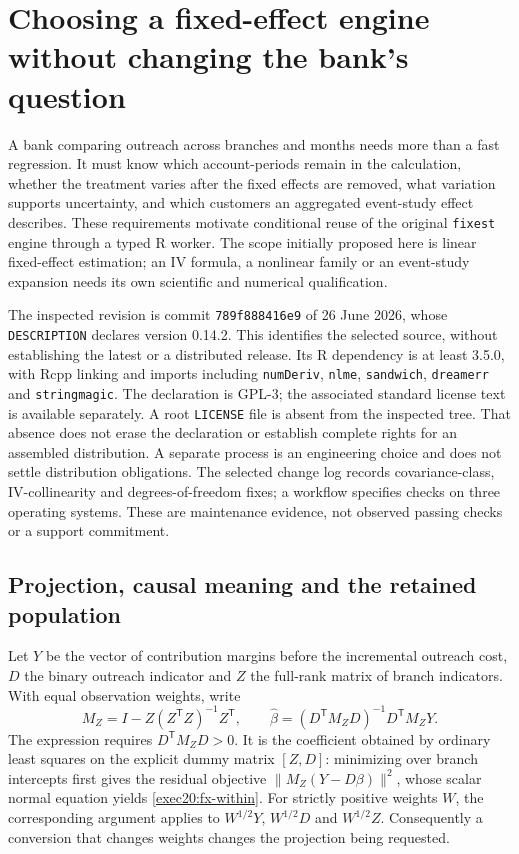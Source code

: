 \section{Choosing a fixed-effect engine without changing the bank's question}
\label{exec20:fx-scope}
A bank comparing outreach across branches and months needs more than a fast
regression. It must know which account-periods remain in the calculation, whether
the treatment varies after the fixed effects are removed, what variation supports
uncertainty, and which customers an aggregated event-study effect describes.
These requirements motivate conditional reuse of the original \texttt{fixest}
engine through a typed R worker. The scope initially proposed here is linear
fixed-effect estimation; an IV formula, a nonlinear family or an event-study
expansion needs its own scientific and numerical qualification.

The inspected revision is commit \texttt{789f888416e9} of 26 June 2026, whose
\texttt{DESCRIPTION} declares version 0.14.2. This identifies the selected source,
without establishing the latest or a distributed release. Its R dependency is
at least 3.5.0, with Rcpp linking and imports including \texttt{numDeriv},
\texttt{nlme}, \texttt{sandwich}, \texttt{dreamerr} and \texttt{stringmagic}.
The declaration is GPL-3; the associated standard license text is available
separately. A root \texttt{LICENSE} file is absent from the inspected tree.
That absence does not erase the declaration or establish complete rights for
an assembled distribution. A separate process is an engineering choice and
does not settle distribution obligations. The selected change log records
covariance-class, IV-collinearity and degrees-of-freedom fixes; a workflow
specifies checks on three operating systems. These are maintenance evidence,
not observed passing checks or a support commitment.~\citep{exec20_fixest_source}

\subsection{Projection, causal meaning and the retained population}
\label{exec20:fx-projection}
Let $Y$ be the vector of contribution margins before the incremental outreach
cost, $D$ the binary outreach indicator and $Z$ the full-rank matrix of branch
indicators. With equal observation weights, write
\begin{equation}
 M_Z=I-Z(Z^{\mathsf T}Z)^{-1}Z^{\mathsf T},\qquad
 \widehat\beta=(D^{\mathsf T}M_ZD)^{-1}D^{\mathsf T}M_ZY.
 \label{exec20:fx-within}
\end{equation}
The expression requires $D^{\mathsf T}M_ZD>0$. It is the coefficient obtained
by ordinary least squares on the explicit dummy matrix $[Z,D]$: minimizing
over branch intercepts first gives the residual objective
$\|M_Z(Y-D\beta)\|^2$, whose scalar normal equation yields
\eqref{exec20:fx-within}. For strictly positive weights $W$, the corresponding
argument applies to $W^{1/2}Y$, $W^{1/2}D$ and $W^{1/2}Z$. Consequently a
conversion that changes weights changes the projection being requested.

